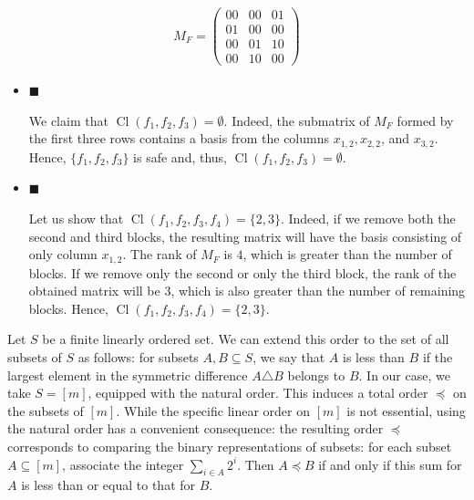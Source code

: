 \documentclass[10pt,a4paper]{article}
\begin{document}
 
\[\begin{gathered}M_{F}=\begin{pmatrix}00&00&01\\
01&00&00\\
00&01&10\\
00&10&00\end{pmatrix}\end{gathered}\] 
 






\begin{itemize}


\item 
$\blacksquare$ 


We claim that $\mathop{\mathrm{Cl}}(f_{1},f_{2},f_{3})=\emptyset$. Indeed, the submatrix of $M_{F}$ formed by the first three rows contains a basis from the columns $x_{1,2},x_{2,2}$, and $x_{3,2}$. Hence, $\{f_{1},f_{2},f_{3}\}$ is safe and, thus, $\mathop{\mathrm{Cl}}(f_{1},f_{2},f_{3})=\emptyset$.\par





\item 
$\blacksquare$ 


Let us show that $\mathop{\mathrm{Cl}}(f_{1},f_{2},f_{3},f_{4})=\{2,3\}$.
Indeed, if we remove both the second and third blocks, the resulting matrix will have the basis consisting of only column $x_{1,2}$. The rank of $M_{F}$ is $4$, which is greater than the number of blocks. If we remove only the second or only the third block, the rank of the obtained matrix will be $3$, which is also greater than the number of remaining blocks. Hence, $\mathop{\mathrm{Cl}}(f_{1},f_{2},f_{3},f_{4})=\{2,3\}$.\par





\end{itemize}




Let $S$ be a finite linearly ordered set. We can extend this order to the set of all subsets of $S$ as follows: for subsets $A,B\subseteq S$, we say that $A$ is less than $B$ if the largest element in the symmetric difference $A\triangle B$ belongs to $B$. In our case, we take $S=[m]$, equipped with the natural order. This induces a total order $\preceq$ on the subsets of $[m]$. While the specific linear order on $[m]$ is not essential, using the natural order has a convenient consequence: the resulting order $\preceq$ corresponds to comparing the binary representations of subsets: for each subset $A\subseteq[m]$, associate the integer $\sum_{i\in A}2^{i}$. Then $A\preceq B$ if and only if this sum for $A$ is less than or equal to that for $B$.\par
\end{document}
